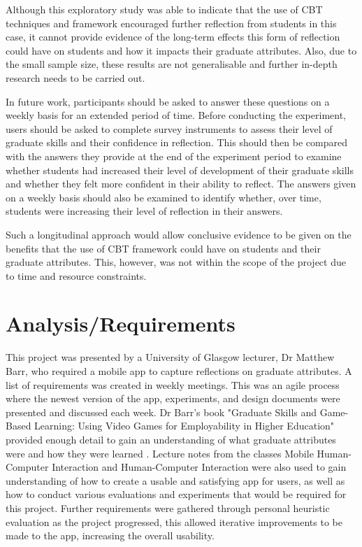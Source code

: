 \documentclass{l4proj}
\begin{document}
Although this exploratory study was able to indicate that the use of CBT techniques and framework encouraged further reflection from students in this case, it cannot provide evidence of the long-term effects this form of reflection could have on students and how it impacts their graduate attributes. Also, due to the small sample size, these results are not generalisable and further in-depth research needs to be carried out. 

In future work, participants should be asked to answer these questions on a weekly basis for an extended period of time. Before conducting the experiment, users should be asked to complete survey instruments to assess their level of graduate skills and their confidence in reflection. This should then be compared with the answers they provide at the end of the experiment period to examine whether students had increased their level of development of their graduate skills and whether they felt more confident in their ability to reflect. The answers given on a weekly basis should also be examined to identify whether, over time, students were increasing their level of reflection in their answers. 

Such a longitudinal approach would allow conclusive evidence to be given on the benefits that the use of CBT framework could have on students and their graduate attributes. This, however, was not within the scope of the project due to time and resource constraints.
 



\chapter{Analysis/Requirements} \label{analysis/reqs}

This project was presented by a University of Glasgow lecturer, Dr Matthew Barr, who required a mobile app to capture reflections on graduate attributes. A list of requirements was created in weekly meetings. This was an agile process where the newest version of the app, experiments, and design documents were presented and discussed each week. Dr Barr's book "Graduate Skills and Game-Based Learning: Using Video Games for Employability in Higher Education" provided enough detail to gain an understanding of what graduate attributes were and how they were learned \citep{barr_2019}. Lecture notes from the classes Mobile Human-Computer Interaction and Human-Computer Interaction were also used to gain understanding of how to create a usable and satisfying app for users, as well as how to conduct various evaluations and experiments that would be required for this project. Further requirements were gathered through personal heuristic evaluation as the project progressed, this allowed iterative improvements to be made to the app, increasing the overall usability.
\end{document}
